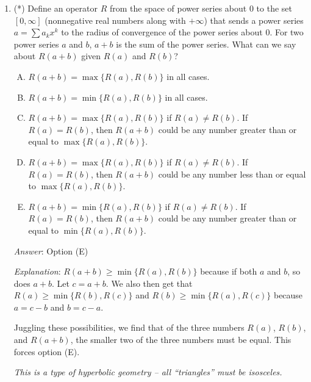 \documentclass[10pt]{amsart}
\begin{document}
\begin{enumerate}
  {\em Answer}: Option (E)

  {\em Explanation}: Put $ u = -x^2$, and we get $\sum_{k=0}^\infty
  u^k/k!$.

  {\em Performance review}: $1$ out of $11$ got this correct. $7$
  chose (C), $2$ chose (D), $1$ chose (B).

  {\em Historical note (last year)}: $12$ out of $26$ people got this
  correct. $7$ chose (C), $3$ each chose (A) and (D), $1$ chose (B).

\item (*) Define an operator $R$ from the space of power series about $0$
  to the set $[0,\infty]$ (nonnegative real numbers along with
  $+\infty$) that sends a power series $a = \sum a_kx^k$ to the radius
  of convergence of the power series about $0$. For two power series
  $a$ and $b$, $a + b$ is the sum of the power series. What can we say
  about $R(a + b)$ given $R(a)$ and $R(b)$?

  \begin{enumerate}[(A)]
  \item $R(a + b) = \max \{ R(a), R(b) \}$ in all cases.
  \item $R(a + b) = \min \{ R(a), R(b) \}$ in all cases.
  \item $R(a + b) = \max \{ R(a), R(b) \}$ if $R(a) \ne R(b)$. If
    $R(a) = R(b)$, then $R(a + b)$ could be any number greater than or
    equal to $\max \{ R(a), R(b) \}$.
  \item $R(a + b) = \max \{ R(a), R(b) \}$ if $R(a) \ne R(b)$. If
    $R(a) = R(b)$, then $R(a + b)$ could be any number less than or
    equal to $\max \{ R(a), R(b) \}$.
  \item $R(a + b) = \min \{ R(a), R(b) \}$ if $R(a) \ne R(b)$. If
    $R(a) = R(b)$, then $R(a + b)$ could be any number greater than or
    equal to $\min \{ R(a), R(b) \}$.
  \end{enumerate}

  {\em Answer}: Option (E)

  {\em Explanation}: $R(a + b) \ge \min \{ R(a), R(b) \}$ because if
  both $a$ and $b$, so does $a + b$. Let $c = a + b$. We also then get
  that $R(a) \ge \min \{ R(b), R(c) \}$ and $R(b) \ge \min \{ R(a),
  R(c) \}$ because $a = c - b$ and $b = c - a$.

  Juggling these possibilities, we find that of the three numbers
  $R(a)$, $R(b)$, and $R(a + b)$, the smaller two of the three numbers
  must be equal. This forces option (E).

  {\em This is a type of hyperbolic geometry -- all ``triangles'' must
  be isosceles.}


\end{enumerate}
\end{document}

